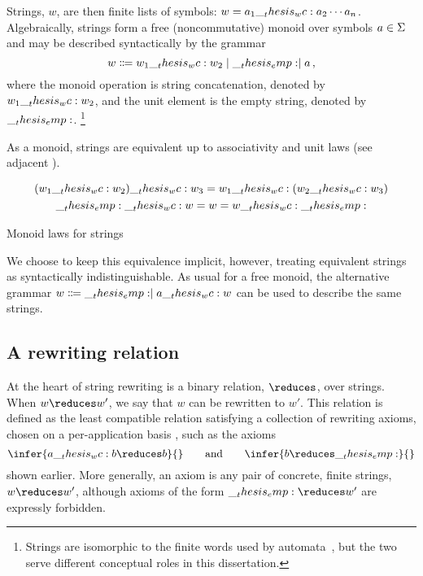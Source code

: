 Strings, $w$, are then finite lists of symbols: $w = a_1 \wc a_2 \dotsb a_n$.
Algebraically, strings form a free (noncommutative) monoid over symbols $a \in \Sigma$ and may be described syntactically by the grammar
\begin{equation*}
  w \Coloneqq w_1 \wc w_2 \mid \emp \mid a
  \,,
\end{equation*}
where the monoid operation is string concatenation, denoted by $w_1 \wc w_2$, and the unit element is the empty string, denoted by $\__thesis_emp:$.%
\footnote{Strings are isomorphic to the finite words used by automata~, but the two serve different conceptual roles in this dissertation.}

As a monoid, strings are equivalent up to associativity and unit laws (see adjacent ).%
\begin{marginfigure}
  \begin{gather*}
    (w_1 \wc w_2) \wc w_3 = w_1 \wc (w_2 \wc w_3) \\
    \emp \wc w = w = w \wc \emp
  \end{gather*}
  \caption{Monoid laws for strings}\label{fig:string-rewriting:monoid-laws}
\end{marginfigure}
We choose to keep this equivalence implicit, however, treating equivalent strings as syntactically indistinguishable.
As usual for a free monoid, the alternative grammar
    $w \Coloneqq \emp \mid a \wc w$
can be used to   describe the same strings.



\subsection{A rewriting relation}

At the heart of string rewriting is a binary relation, $\reduces$, over strings.
When $w \reduces w'$, we say that $w$ can be rewritten to $w'$.
This relation is defined as the least compatible relation satisfying a collection of rewriting axioms, chosen on a per-application basis%
, such as the axioms
\begin{equation*}%
  \infer{a \wc b \reduces b}{}
  \qquad\text{and}\qquad
  \infer{b \reduces \emp}{}
\end{equation*}
shown earlier.
More generally, an axiom is any pair of concrete, finite strings, $w \reduces w'$, although axioms of the form $\emp \reduces w'$ are expressly forbidden.

